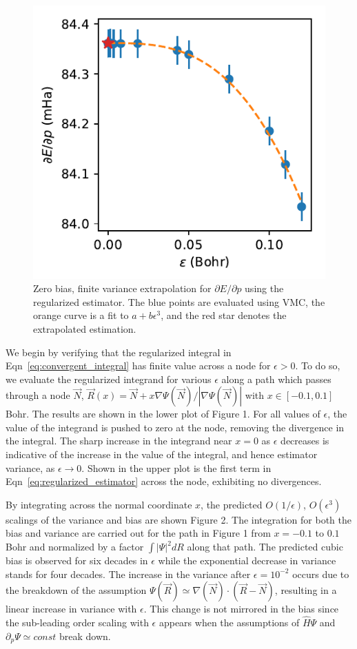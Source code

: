 \documentclass[twocolumn]{revtex4-1}
\begin{document}
\begin{figure}
\includegraphics{../2_plots/dedp.pdf}
\caption{Zero bias, finite variance extrapolation for $\partial E/\partial p$ using the regularized estimator. The blue points are evaluated using VMC, the orange curve is a fit to $a + b\epsilon^3$, and the red star denotes the extrapolated estimation. }
\end{figure}

We begin by verifying that the regularized integral in Eqn~\ref{eq:convergent_integral} has finite value across a node for $\epsilon > 0$. 
To do so, we evaluate the regularized integrand for various $\epsilon$ along a path which passes through a node $\vec{N}$, $\vec{R}(x) = \vec{N} + x \nabla \Psi(\vec{N})/|\nabla \Psi(\vec{N})|$ with $x \in [-0.1, 0.1]$ Bohr.
The results are shown in the lower plot of Figure 1.
For all values of $\epsilon$, the value of the integrand is pushed to zero at the node, removing the divergence in the integral.
The sharp increase in the integrand near $x=0$ as $\epsilon$ decreases is indicative of the increase in the value of the integral, and hence estimator variance, as $\epsilon \rightarrow 0$.
Shown in the upper plot is the first term in Eqn~\ref{eq:regularized_estimator} across the node, exhibiting no divergences.

By integrating across the normal coordinate $x$, the predicted $O(1/\epsilon)$, $O(\epsilon^3)$ scalings of the variance and bias are shown Figure 2.
The integration for both the bias and variance are carried out for the path in Figure 1 from $x = -0.1$ to $0.1$ Bohr and normalized by a factor $\int |\Psi|^2 dR$ along that path.
The predicted cubic bias is observed for six decades in $\epsilon$ while the exponential decrease in variance stands for four decades.
The increase in the variance after $\epsilon = 10^{-2}$ occurs due to the breakdown of the assumption $\Psi(\vec{R}) \simeq \nabla(\vec{N}) \cdot (\vec{R}-\vec{N})$, resulting in a linear increase in variance with $\epsilon$.
This change is not mirrored in the bias since the sub-leading order scaling with $\epsilon$ appears when the assumptions of $\hat{H}\Psi$ and $\partial_p \Psi \simeq const$ break down.
\end{document}
